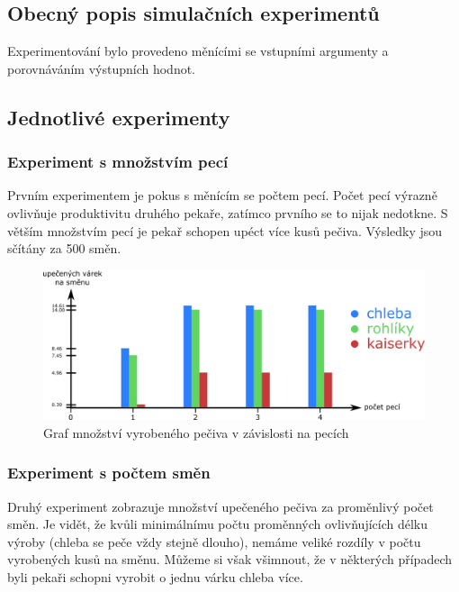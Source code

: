 \documentclass[11pt]{article}
\begin{document}
\subsection{Obecný popis simulačních experimentů}
Experimentování bylo provedeno měnícími se vstupními argumenty a porovnáváním výstupních hodnot.
\subsection{Jednotlivé experimenty}
\subsubsection{Experiment s množstvím pecí}
Prvním experimentem je pokus s měnícím se počtem pecí. Počet pecí výrazně ovlivňuje produktivitu druhého pekaře, zatímco prvního se to nijak nedotkne. S větším množstvím pecí je pekař schopen upéct více kusů pečiva. Výsledky jsou sčítány za 500 směn. 

\begin{figure}[H]
  \includegraphics[width=\linewidth]{pece.jpg}
  \caption{Graf množství vyrobeného pečiva v závislosti na pecích}
  \label{fig:pece}
\end{figure}

\subsubsection{Experiment s počtem směn}
Druhý experiment zobrazuje množství upečeného pečiva za proměnlivý počet směn. Je vidět, že kvůli minimálnímu počtu proměnných ovlivňujících délku výroby (chleba se peče vždy stejně dlouho), nemáme veliké rozdíly v počtu vyrobených kusů na směnu. Můžeme si však všimnout, že v některých případech byli pekaři schopni vyrobit o jednu várku chleba více.
\end{document}
